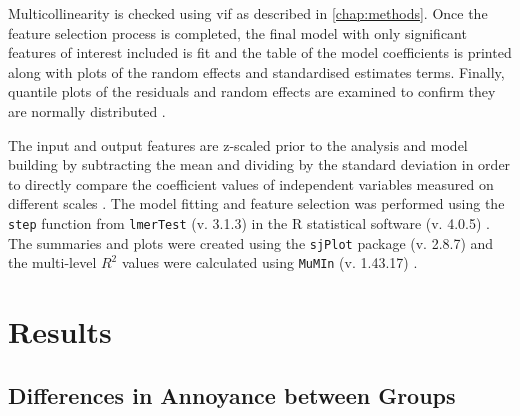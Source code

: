 Multicollinearity is checked using \gls{vif} as described in \cref{chap:methods}. Once the feature selection process is completed, the final model with only significant features of interest included is fit and the table of the model coefficients is printed along with plots of the random effects and standardised estimates terms. Finally, quantile plots of the residuals and random effects are examined to confirm they are normally distributed \citep{Harrison2018brief}.

The input and output features are z-scaled prior to the analysis and model building by subtracting the mean and dividing by the standard deviation in order to directly compare the coefficient values of independent variables measured on different scales \citep{Harrison2018brief}. The model fitting and feature selection was performed using the \texttt{step} function from \texttt{lmerTest} (v. 3.1.3) \citep{Kuznetsova2017lmerTest} in the R statistical software (v. 4.0.5) \citep{RCT2018R}. The summaries and plots were created using the \texttt{sjPlot} package (v. 2.8.7) \citep{Luedecke2021sjPlot} and the multi-level $R^2$ values were calculated using \texttt{MuMIn} (v. 1.43.17) \citep{Barton2020MuMIN}.


\section{Results}

\subsection{Differences in Annoyance between Groups \label{sec:groupDiffs}}

